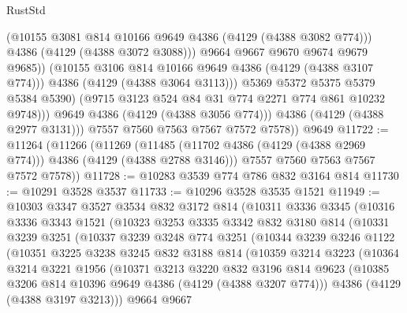 \begin{lexlean}{RustStd}
\begin{coremodule}
{\begin{coremodule}
{{{{{{{{{{{{{{                          (@10155 @3081 @814 @10166 @9649 @4386 (@4129 (@4388 @3082 @774)))
                          @4386
                          (@4129 (@4388 @3072 @3088)))
                        @9664
                        @9667
                        @9670
                        @9674
                        @9679
                        @9685))
                    (@10155 @3106 @814 @10166 @9649 @4386 (@4129 (@4388 @3107 @774)))
                    @4386
                    (@4129 (@4388 @3064 @3113)))
                  @5369
                  @5372
                  @5375
                  @5379
                  @5384
                  @5390)
                (@9715 @3123 @524 @84 @31 @774 @2271 @774 @861 @10232 @9748)))
            @9649
            @4386
            (@4129 (@4388 @3056 @774)))
          @4386
          (@4129 (@4388 @2977 @3131)))
        @7557
        @7560
        @7563
        @7567
        @7572
        @7578))
    @9649
@11722 := @11264
    (@11266
      (@11269
        (@11485 (@11702 @4386 (@4129 (@4388 @2969 @774))) @4386 (@4129 (@4388 @2788 @3146)))
        @7557
        @7560
        @7563
        @7567
        @7572
        @7578))
@11728 := @10283 @3539 @774 @786 @832 @3164 @814
@11730 := @10291 @3528 @3537
@11733 := @10296 @3528 @3535 @1521
@11949 := @10303
    @3347
    @3527
    @3534
    @832
    @3172
    @814
    (@10311
      @3336
      @3345
      (@10316
        @3336
        @3343
        @1521
        (@10323
          @3253
          @3335
          @3342
          @832
          @3180
          @814
          (@10331
            @3239
            @3251
            (@10337
              @3239
              @3248
              @774
              @3251
              (@10344
                @3239
                @3246
                @1122
                (@10351
                  @3225
                  @3238
                  @3245
                  @832
                  @3188
                  @814
                  (@10359
                    @3214
                    @3223
                    (@10364
                      @3214
                      @3221
                      @1956
                      (@10371
                        @3213
                        @3220
                        @832
                        @3196
                        @814
                        @9623
                        (@10385 @3206 @814 @10396 @9649 @4386 (@4129 (@4388 @3207 @774)))
                        @4386
                        (@4129 (@4388 @3197 @3213)))
                      @9664
                      @9667
}}}}}}}}}}}}}}
\end{coremodule}}
\end{coremodule}
\end{lexlean}
